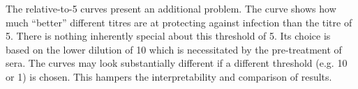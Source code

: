 The relative-to-5 curves present an additional problem. The curve shows how much ``better'' different titres are at protecting against infection than the titre of 5.
There is nothing inherently special about this threshold of 5. Its choice is based on the lower dilution of 10 which is necessitated by the pre-treatment of sera. The curves may look substantially different if a different threshold (e.g. 10 or 1) is chosen. This hampers the interpretability and comparison of results.
